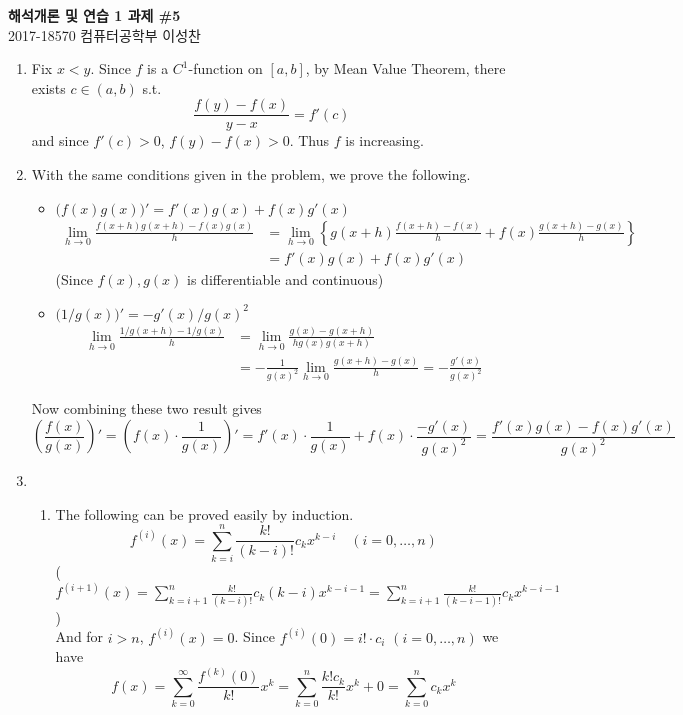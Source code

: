 \documentclass[11pt]{report}
\newcommand{\ra}{\rightarrow}
\begin{document}
\begin{center}
\textbf{\Large 해석개론 및 연습 1 과제 \#5}\\
\large 2017-18570 컴퓨터공학부 이성찬
\end{center}
\begin{enumerate}
\item Fix $x < y$. Since $f$ is a $C^1$-function on $[a, b]$, by Mean Value Theorem, there exists $c\in (a, b)$ s.t.
$$\frac{f(y) - f(x)}{y-x} = f'(c)$$
and since $f'(c) > 0$, $f(y) -f(x) > 0$. Thus $f$ is increasing.

\item With the same conditions given in the problem, we prove the following.
\begin{itemize}
	\item $\big(f(x)g(x)\big)' = f'(x)g(x) + f(x)g'(x)$\\
	$$\begin{aligned}
		\lim_{h\ra0} \frac{f(x+h)g(x+h)-f(x)g(x)}{h}&=
		\lim_{h\ra0} \left\{g(x+h)\frac{f(x+h)-f(x)}{h} + f(x)\frac{g(x+h)-g(x)}{h}\right\}\\
		&=f'(x)g(x)+f(x)g'(x)
	\end{aligned}$$
	(Since $f(x), g(x)$ is differentiable and continuous)
	\item $\big(1/g(x)\big)'=-g'(x) / g(x)^2$\\
	$$\begin{aligned}
		\lim_{h\ra0} \frac{1/g(x+h)-1/g(x)}{h} &= \lim_{h\ra0} \frac{g(x)-g(x+h)}{h g(x)g(x+h)}\\
		&= -\frac{1}{g(x)^2}\lim_{h\ra0} \frac{g(x+h)-g(x)}{h} = -\frac{g'(x)}{g(x)^2}
	\end{aligned}$$
\end{itemize}
Now combining these two result gives $$\left(\frac{f(x)}{g(x)}\right)' = \left(f(x) \cdot \frac{1}{g(x)}\right)' = f'(x) \cdot \frac{1}{g(x)} + f(x) \cdot \frac{-g'(x)}{g(x)^2} = \frac{f'(x)g(x) - f(x)g'(x)}{g(x)^2}$$

\item
\begin{enumerate}
	\item The following can be proved easily by induction. $$f^{(i)}(x) = \sum_{k=i}^{n} \frac{k!}{(k-i)!} c_k x^{k-i}\quad (i=0, \dots, n)$$
	($f^{(i+1)}(x) = \sum_{k=i+1}^{n} \frac{k!}{(k-i)!}c_k(k-i)x^{k-i-1} = \sum_{k=i+1}^n \frac{k!}{(k-i-1)!}c_kx^{k-i-1}$)\\
	And for $i > n$, $f^{(i)}(x) = 0$. Since $f^{(i)}(0) = i! \cdot c_i$ $(i =0, \dots, n)$ we have
	$$f(x) = \sum_{k=0}^{\infty}\frac{f^{(k)}(0)}{k!}x^k=\sum_{k=0}^n \frac{k!c_k}{k!}x^k + 0 = \sum_{k=0}^n c_kx^k $$


\end{enumerate}
\end{enumerate}
\end{document}
